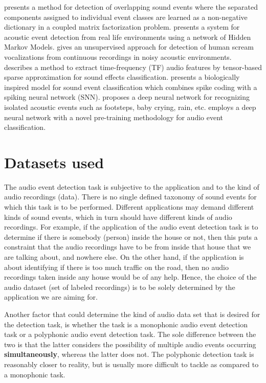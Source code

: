 \cite{mesaros2015sound} presents a method for detection of overlapping sound events where the separated components assigned to individual event classes are learned as a non-negative dictionary in a coupled matrix factorization problem. \cite{mesaros2010acoustic} presents a system for acoustic event detection from real life environments using a network of Hidden Markov Models. \cite{nandwanarobust} gives an unsupervised approach for detection of human scream vocalizations from continuous recordings in noisy acoustic environments. \cite{zhang2015acoustic} describes a method to extract time-frequency (TF) audio features by tensor-based sparse approximation for sound effects classification. \cite{dennis2015combining} presents a biologically inspired model for sound event classification which combines spike coding with a spiking neural network (SNN). \cite{gencoglu2014recognition} proposes a deep neural network for recognizing isolated acoustic events such as footsteps, baby crying, rain, etc. \cite{kons2013audio} employs a deep neural network with a novel pre-training methodology for audio event classification.

\section{Datasets used}

The audio event detection task is subjective to the application and to the kind of audio recordings (data). There is no single defined taxonomy of sound events for which this task is to be performed. Different applications may demand different kinds of sound events, which in turn should have different kinds of audio recordings. For example, if the application of the audio event detection task is to determine if there is somebody (person) inside the house or not, then this puts a constraint that the audio recordings have to be from inside that house that we are talking about, and nowhere else. On the other hand, if the application is about identifying if there is too much traffic on the road, then no audio recordings taken inside any house would be of any help. Hence, the choice of the audio dataset (set of labeled recordings) is to be solely determined by the application we are aiming for. 

Another factor that could determine the kind of audio data set that is desired for the detection task, is whether the task is a monophonic audio event detection task or a polyphonic audio event detection task. The sole difference between the two is that the latter considers the possibility of multiple audio events occurring \textbf{simultaneously}, whereas the latter does not. The polyphonic detection task is reasonably closer to reality, but is usually more difficult to tackle as compared to a monophonic task.

